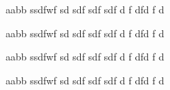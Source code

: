 

\begin{exercice}[
  type=fun,
  difficulty=vhard]{aa}{bb}
  ssdfwf sd sdf sdf sdf d f dfd f d
\end{exercice}
\begin{exercice}[
  type=training,
  difficulty=vhard]{aa}{bb}
  ssdfwf sd sdf sdf sdf d f dfd f d
\end{exercice}
\begin{exercice}[
  type=fun,
  difficulty=hard]{aa}{bb}
  ssdfwf sd sdf sdf sdf d f dfd f d
\end{exercice}
\begin{exercice}[
  type=fun,
  source/name=ccp,
  source/year=1998,
  difficulty=vhard]{aa}{bb}
  ssdfwf sd sdf sdf sdf d f dfd f d
\end{exercice}


